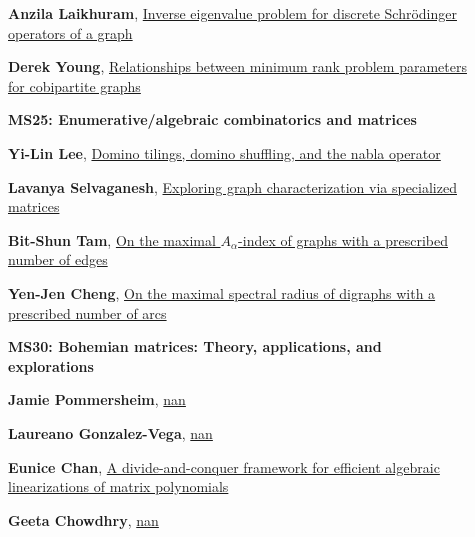 \documentclass[ILAS2025-program.tex]{subfiles}
\begin{document}
\begin{description}
\begin{description}
        \item[] \hypertarget{up0223}{}\textbf{Anzila Laikhuram}, \hyperlink{down0223}{Inverse eigenvalue problem for discrete Schrödinger operators of a graph}
        \item[] \hypertarget{up0224}{}\textbf{Derek Young}, \hyperlink{down0224}{Relationships between minimum rank problem parameters for cobipartite graphs}
        \end{description}
    \begin{description}
    \item[] {\color{mstitle}\textbf{MS25: Enumerative/algebraic combinatorics and matrices}} 
    \item[] \hypertarget{up0225}{}\textbf{Yi-Lin Lee}, \hyperlink{down0225}{Domino tilings, domino shuffling, and the nabla operator}
        \item[] \hypertarget{up0226}{}\textbf{Lavanya Selvaganesh}, \hyperlink{down0226}{Exploring graph characterization via specialized matrices
}
        \item[] \hypertarget{up0227}{}\textbf{Bit-Shun Tam}, \hyperlink{down0227}{On the maximal $A_\alpha$-index of graphs with a prescribed number of edges}
        \item[] \hypertarget{up0228}{}\textbf{Yen-Jen Cheng}, \hyperlink{down0228}{On the maximal spectral radius of digraphs with a prescribed number of arcs
}
        \end{description}
    \begin{description}
    \item[] {\color{mstitle}\textbf{MS30: Bohemian matrices: Theory, applications, and explorations}} 
    \item[] \hypertarget{up0229}{}\textbf{Jamie Pommersheim}, \hyperlink{down0229}{nan}
        \item[] \hypertarget{up0230}{}\textbf{Laureano Gonzalez-Vega}, \hyperlink{down0230}{nan}
        \item[] \hypertarget{up0231}{}\textbf{Eunice Chan}, \hyperlink{down0231}{A divide-and-conquer framework for efficient algebraic linearizations of matrix polynomials}
        \item[] \hypertarget{up0232}{}\textbf{Geeta Chowdhry}, \hyperlink{down0232}{nan}

\end{description}
\end{description}
\end{document}
